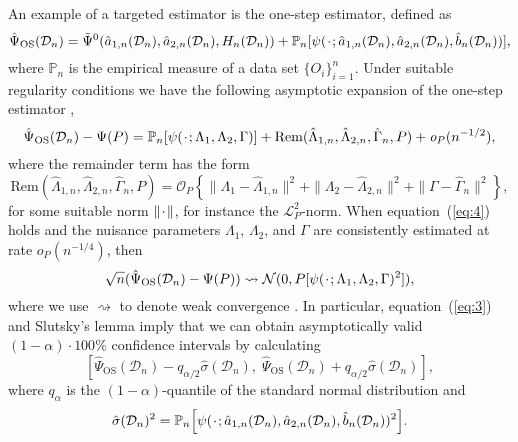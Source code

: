 \documentclass[numsec,webpdf,contemporary,medium,namedate]{oup-authoring-template}%
\theoremstyle{thmstyleone}%
\theoremstyle{thmstyletwo}%
\theoremstyle{thmstylethree}%
\newcommand{\blank}{\makebox[1ex]{\textbf{$\cdot$}}}
\newcommand{\weakly}{\rightsquigarrow}
\newcommand\smallO{\textit{o}}
\newcommand{\1}{\mathds{1}}
\newcommand{\empmeas}{\ensuremath{\mathbb{P}_n}} %
\newcommand{\data}{\ensuremath{\mathcal{D}}}
\begin{document}
An example of a targeted estimator is the one-step estimator, defined as
\begin{equation}
    \label{eq:one-step-def}
    \hat{\Psi}_{\text{OS}}(\data_n)
    =
    \tilde{\Psi}^0(\hat{a}_{1,n}(\data_n), \hat{a}_{2,n}(\data_n),
    H_n(\data_n))
    + \empmeas{[\psi(\blank; \hat{a}_{1,n}(\data_n), \hat{a}_{2,n}(\data_n),
      \hat{b}_n(\data_n) )]},
\end{equation}
where \( \empmeas \) is the empirical measure of a data set
\(\{O_i\}_{i=1}^n\).
Under suitable regularity conditions
we have the
following asymptotic expansion of the one-step estimator
\citep{pfanzagl1985contributions,van2003unified,fisher2021visually,kennedy2022semiparametric},
\begin{equation*}
  \hat{\Psi}_{\text{OS}}(\data_n)- \Psi(P)
  =  \empmeas{[\psi(\blank ; \Lambda_1, \Lambda_2, \Gamma)]}
  +\mathrm{Rem}{(\hat{\Lambda}_{1,n},\hat{\Lambda}_{2,n},  \hat{\Gamma}_n, P)} + \smallO_{P}(n^{-1/2}),
\end{equation*}
where the remainder term has the form
\begin{equation}
  \label{eq:4}
  \mathrm{Rem}{(\hat{\Lambda}_{1,n},\hat{\Lambda}_{2,n},  \hat{\Gamma}_n, P)}
  = \mathcal{O}_P{
    \left\{
      \|\Lambda_1-\hat{\Lambda}_{1,n}\|^2
      +
      \|\Lambda_2-\hat{\Lambda}_{2,n}\|^2
      +
      \|\Gamma-\hat{\Gamma}_{n}\|^2
    \right\}
  },
\end{equation}
for some suitable norm \( \|\blank \| \), for instance the
\( \mathcal{L}_{P}^2 \)-norm. When equation~(\ref{eq:4}) holds and the
nuisance parameters $\Lambda_1$, $\Lambda_2$, and $\Gamma$ are
consistently estimated at rate \( \smallO_P{(n^{-1/4})} \), then
\begin{equation}
  \label{eq:3}
  \sqrt{n}(\hat{\Psi}_{\text{OS}}(\data_n)- \Psi(P)) \weakly \mathcal{N}(0,
  P{[\psi(\blank; \Lambda_1, \Lambda_2, \Gamma)^2]}),
\end{equation}
where we use \( \weakly \) to denote weak convergence \citep{van2000asymptotic}.
In particular, equation~(\ref{eq:3}) and Slutsky's lemma imply that we can
obtain asymptotically valid \((1-\alpha)\cdot100\%\) confidence intervals by
calculating
\begin{equation*}
  \left[
    \hat{\Psi}_{\text{OS}}(\data_n) - q_{\alpha/2} \hat{\sigma}(\data_n) ,
    \;
    \hat{\Psi}_{\text{OS}}(\data_n) + q_{\alpha/2} \hat{\sigma}(\data_n)
  \right],
\end{equation*}
where \( q_{\alpha} \) is the \( (1-\alpha) \)-quantile of the standard normal
distribution and
\begin{equation*}
  \hat{\sigma}(\data_n)^2 = \empmeas{ \left[ \psi(\blank;
      \hat{a}_{1,n}(\data_n), \hat{a}_{2,n}(\data_n), \hat{b}_n(\data_n))^2
    \right]}.
\end{equation*}
\end{document}
